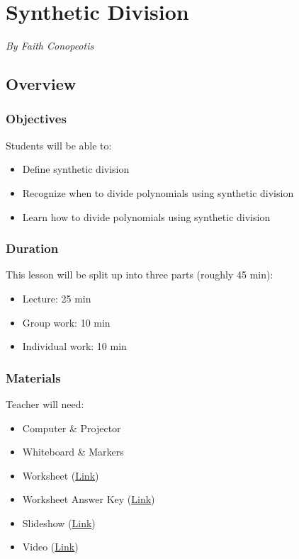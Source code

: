 \chapter{Synthetic Division}

\emph{By Faith Conopeotis}

\section{Overview}

\subsection{Objectives}

Students will be able to:
\begin{itemize}
    \item Define synthetic division
    \item Recognize when to divide polynomials using synthetic division
    \item Learn how to divide polynomials using synthetic division
\end{itemize}

\subsection{Duration}

This lesson will be split up into three parts (roughly 45 min):
\begin{itemize}
    \item Lecture: 25 min
    \item Group work: 10 min
    \item Individual work: 10 min
\end{itemize}

\subsection{Materials}

Teacher will need:
\begin{itemize}
    \item Computer \& Projector
    \item Whiteboard \& Markers
    \item Worksheet (\href{https://docs.google.com/document/d/1HKYbJtd42jh1GWfWh5GD5qbosMRKXrE86Zldi-lMgnQ/edit?usp=sharing}{Link})
    \item Worksheet Answer Key (\href{https://docs.google.com/document/d/11MaOdGLrB1454qrrkZYvaxijsIcwRAB8fi_g2UDCRQE/edit?usp=sharing}{Link})
    \item Slideshow (\href{https://docs.google.com/presentation/d/1nxi8WIntP3aSjfRn5nGwJmopC85xrW9zZ4EOi68K5cQ/edit?usp=sharing}{Link})
    \item Video (\href{https://youtu.be/7mS5LmJffgw?si=Mkinr-KE5xFuVt75}{Link})
\end{itemize}

